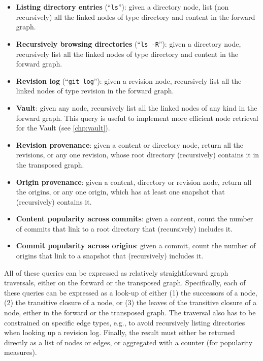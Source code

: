 \begin{itemize}
    \item \textbf{Listing directory entries} (``\texttt{ls}''): given a
        directory node, list (non recursively) all the linked nodes of type
        directory and content in the forward graph.
    \item \textbf{Recursively browsing directories} (``\texttt{ls -R}''): given
        a directory node, recursively list all the linked nodes of type
        directory and content in the forward graph.
    \item \textbf{Revision log} (``\texttt{git log}''): given
        a revision node, recursively list all the linked nodes of type
        revision in the forward graph.
    \item \textbf{Vault}: given any node, recursively list all the linked nodes
        of any kind in the forward graph. This query is useful to implement
        more efficient node retrieval for the Vault (see \cref{chp:vault}).
    \item \textbf{Revision provenance}: given a content or directory node,
        return all the revisions, or any one revision, whose root directory
        (recursively) contains it in the transposed graph.
    \item \textbf{Origin provenance}: given a content, directory or revision
        node, return all the origins, or any one origin, which has at least one
        snapshot that (recursively) contains it.
    \item \textbf{Content popularity across commits}: given a content, count
        the number of commits that link to a root directory that (recursively)
        includes it.
    \item \textbf{Commit popularity across origins}: given a commit, count
        the number of origins that link to a snapshot that (recursively)
        includes it.
\end{itemize}

All of these queries can be expressed as relatively straightforward graph
traversals, either on the forward or the transposed graph. Specifically, each
of these queries can be expressed as a look-up of either (1) the successors of
a node, (2) the transitive closure of a node, or (3) the leaves of the
transitive closure of a node, either in the forward or the transposed graph.
The traversal also has to be constrained on specific edge types, e.g., to avoid
recursively listing directories when looking up a revision log. Finally, the
result must either be returned directly as a list of nodes or edges, or
aggregated with a counter (for popularity measures).

